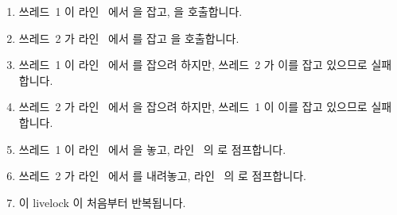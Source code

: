 \begin{fcvref}
\begin{enumerate}
\item	쓰레드~1 이 라인~ 에서  을 잡고,
	 을 호출합니다.
\item	쓰레드~2 가 라인~ 에서  를 잡고
	 을 호출합니다.
\item	쓰레드~1 이 라인~ 에서  를 잡으려 하지만,
	쓰레드~2 가 이를 잡고 있으므로 실패합니다.
\item	쓰레드~2 가 라인~ 에서  을 잡으려 하지만,
	쓰레드~1 이 이를 잡고 있으므로 실패합니다.
\item	쓰레드~1 이 라인~ 에서  을 놓고,
	라인~ 의  로 점프합니다.
\item	쓰레드~2 가 라인~ 에서  를 내려놓고,
	라인~ 의  로 점프합니다.
\item	이 livelock 이 처음부터 반복됩니다.

\end{enumerate}
\end{fcvref}

